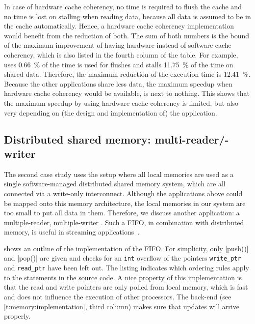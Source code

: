 In case of hardware cache coherency, no time is required to flush the cache and no time is lost on stalling when reading data, because all data is assumed to be in the cache automatically.
Hence, a hardware cache coherency implementation would benefit from the reduction of both.
The sum of both numbers is the bound of the maximum improvement of having hardware instead of software cache coherency, which is also listed in the fourth column of the table.
For example,  uses \SI{0.66}{\percent} of the time is used for flushes and stalls \SI{11.75}{\percent} of the time on shared data.
Therefore, the maximum reduction of the execution time is \SI{12.41}{\percent}.
Because the other applications share less data, the maximum speedup when hardware cache coherency would be available, is next to nothing.
This shows that the maximum speedup by using hardware cache coherency is limited, but also very depending on (the design and implementation of) the application.


\subsection{Distributed shared memory: multi-reader/-writer }

The second case study uses the setup where all local memories are used as a single software-managed distributed shared memory system, which are all connected via a write-only interconnect.
Although the \SPLASH* applications above could be mapped onto this memory architecture, the local memories in our system are too small to put all data in them.
Therefore, we discuss another application: a multiple-reader, multiple-writer .
Such a \ac{FIFO}, in combination with distributed memory, is useful in streaming applications~\cite{denolf:csdf,bijlsma:buffers}.

 shows an outline of the implementation of the \ac{FIFO}.
For simplicity, only \lsticode|push()| and \lsticode|pop()| are given and checks for an \lstinline|int| overflow of the pointers \lstinline|write_ptr| and \lstinline|read_ptr| have been left out.
The listing indicates which ordering rules apply to the statements in the source code.
A nice property of this implementation is that the read and write pointers are only polled from local memory, which is fast and does not influence the execution of other processors.
The  back-end (see \vref{t:memory:implementation}, third column) makes sure that updates will arrive properly.

